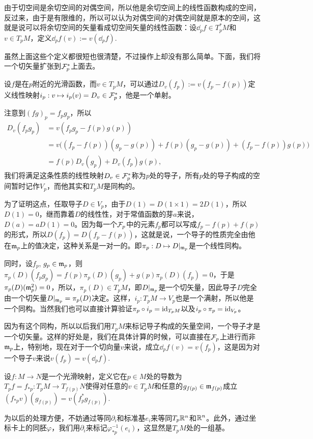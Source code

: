 由于切空间是余切空间的对偶空间，所以他是余切空间上的线性函数构成的空间，反过来，由于是有限维的，所以可以认为对偶空间的对偶空间就是原本的空间，这就是说可以将余切空间的矢量看成切空间矢量的线性函数：设$\dd_p f\in T_p^*M$和$v\in T_pM$，定义$\dd_p f(v):=v(\dd_p f)$.

虽然上面这些个定义都很短也很清楚，不过操作上却没有那么简单。下面，我们将一个切矢量扩张到$\mathcal{F}_p^*$上面去。

设$f$是在$p$附近的光滑函数，而$v\in T_pM$，可以通过$D_v(f_p):=v(f_p-f(p))$定义线性映射$i_p:v\mapsto i_p(v)=D_v\in \mathcal{F}_p^*$，他是一个单射。

注意到$(fg)_p=f_pg_p$，所以
\begin{align*}
	D_v(f_pg_p)&=v(f_pg_p-f(p)g(p))\\
	&=v\bigl((f_p-f(p))(g_p-g(p))+f(p)(g_p-g(p))+(f_p-f(p))g(p)\bigr)\\
	&=f(p)D_v(g_p)+D_v(f_p)g(p),
\end{align*}
我们将满足这条性质的线性映射$D_v\in \mathcal{F}_p^*$称为$p$处的导子，所有$p$处的导子构成的空间暂时记作$V_p$，而他其实和$T_pM$是同构的。

为了证明这点，任取导子$D\in V_p$，由于$D(1)=D(1\times 1)=2D(1)$，所以$D(1)=0$，继而靠着$D$的线性性，对于常值函数的芽$a$来说，$D(a)=aD(1)=0$。因为每一个$\mathcal{F}_p$中的元素$f_p$都可以写成$f_p-f(p)+f(p)$的形式，所以$D(f_p)=D(f_p-f(p))$，这就是说，一个导子的性质完全由他在$\mathfrak{m}_p$上的值决定，这种关系是一对一的。即$\pi_p:D\mapsto D|_{\mathfrak{m}_p}$是一个线性同构。

同时，设$f_p$, $g_p\in \mathfrak{m}_p$，则$\pi_p(D)(f_pg_p)=f(p)\pi_p(D)(g_p)+g(p)\pi_p(D)(f_p)=0$，于是$\pi_p(D)(\mathfrak{m}_p^2)=0$，所以，$\pi_p(D)\in T_pM$，即$D|_{\mathfrak{m}_p}$是一个切矢量，因此导子$D$完全由一个切矢量$D|_{\mathfrak{m}_p}=\pi_p(D)$决定。这样，$i_p:T_pM\to V_p$也是一个满射，所以他是一个同构。当然我们也可以直接计算验证$\pi_p\circ i_p=\operatorname{id}_{T_pM}$以及$i_p\circ \pi_p=\operatorname{id}_{V_p}$。

因为有这个同构，所以以后我们用$T_pM$来标记导子构成的矢量空间，一个导子才是一个切矢量。这样的好处是，我们在具体计算的时候，可以直接在$\mathcal{F}_p$上进行而非$\mathfrak{m}_p$上，特别地，现在对于一个切向量$v$来说，成立$\dd_pf(v)=v(f_p)$，这是因为对一个导子$v$来说$v(f_p)=v(\dd_pf)$.

\para 设$f:M\to N$是一个光滑映射，定义它在$p\in M$处的导数为$T_pf=f_{*p}:T_pM\to T_{f(p)}N$使得对任意的$v\in T_p M$和任意的$g_{f(p)}\in \mathfrak{m}_{f(p)}$成立$(f_{*p}v)(g_{f(p)})=v(f_p^*g_{f(p)})$.

为以后的处理方便，不妨通过等同$\partial_i$和标准基$e_i$来等同$T_p\mathbb{R}^n$和$\mathbb{R}^n$。此外，通过坐标卡上的同胚$\varphi$，我们用$\partial_i$来标记$\varphi^{-1}_{*p}(e_i)$，这显然是$T_pM$处的一组基。


